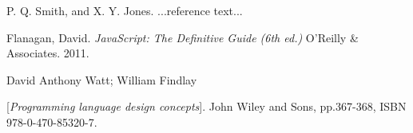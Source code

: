 \documentclass[]{sigplanconf}
\begin{document}




\begin{thebibliography}{}
\softraggedright

P. Q. Smith, and X. Y. Jones. ...reference text...


Flanagan, David. 
\textit{JavaScript: The Definitive Guide (6th ed.)  }O'Reilly & Associates.
 2011.
 
 
David Anthony Watt; William Findlay

[\textit{Programming language design concepts}]. 
John Wiley and Sons, pp.367-368,  ISBN 978-0-470-85320-7.

\end{thebibliography}
\end{document}
